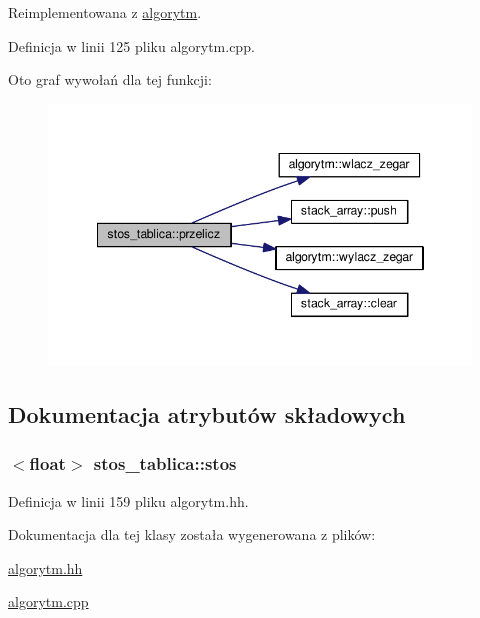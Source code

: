 Reimplementowana z \hyperlink{classalgorytm_af3f92bf537b1f2e1f93173983e838449}{algorytm}.



Definicja w linii 125 pliku algorytm.\-cpp.



Oto graf wywołań dla tej funkcji\-:\nopagebreak
\begin{figure}[H]
\begin{center}
\leavevmode
\includegraphics[width=346pt]{classstos__tablica_a44ec89c9723d4034e46ae3b51b01faea_cgraph}
\end{center}
\end{figure}




\subsection{Dokumentacja atrybutów składowych}
\hypertarget{classstos__tablica_a8aa72aa52bd2436cb12d9e1c8e077389}{
\subsubsection[{stos}]{$<$float$>$ stos\-\_\-tablica\-::stos\hspace{0.3cm}{\ttfamily [private]}}}\label{classstos__tablica_a8aa72aa52bd2436cb12d9e1c8e077389}


Definicja w linii 159 pliku algorytm.\-hh.



Dokumentacja dla tej klasy została wygenerowana z plików\-:\begin{DoxyCompactItemize}
\item 
\hyperlink{algorytm_8hh}{algorytm.\-hh}\item 
\hyperlink{algorytm_8cpp}{algorytm.\-cpp}\end{DoxyCompactItemize}
